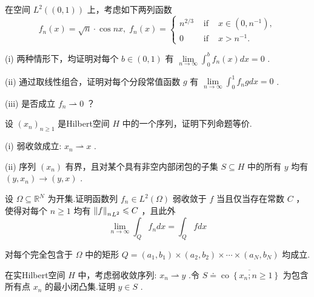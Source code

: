 \begin{rbhw}
在空间 ${L}^{2}\left( \left(  {0,1}\right)  \right)$ 上，考虑如下两列函数
\[
{f}_{n}\left( x\right)  = \sqrt{n} \cdot  \cos {nx},\;{f}_{n}\left( x\right)  = \left\{  \begin{matrix} {n}^{2/3} & \text{ if } & x \in  \left(  {0,{n}^{-1}}\right)  , \\  0 & \text{ if } & x > {n}^{-1}. \end{matrix}\right.
\]

(i) 两种情形下，均证明对每个 $b \in  \left(  {0,1}\right)$ 有 $\mathop{\lim }\limits_{{n \rightarrow  \infty }}{\int }_{0}^{b}{f}_{n}\left( x\right) {dx} = 0$ .

(ii) 通过取线性组合，证明对每个分段常值函数 $g$ 有 $\mathop{\lim }\limits_{{n \rightarrow  \infty }}{\int }_{0}^{1}{f}_{n}{gdx} = 0$ .

(iii) 是否成立 ${f}_{n} \rightharpoonup  0$ ？
\end{rbhw}

\begin{rbhw}
设 ${\left( {x}_{n}\right) }_{n \geq  1}$ 是Hilbert空间 $H$ 中的一个序列，证明下列命题等价.

(i) 弱收敛成立: ${x}_{n} \rightharpoonup  x$ .

(ii) 序列 $\left( {x}_{n}\right)$ 有界，且对某个具有非空内部闭包的子集 $S \subseteq  H$ 中的所有 $y$ 均有 $\left( {y,{x}_{n}}\right)  \rightarrow  \left( {y,x}\right)$ .
\end{rbhw}

\begin{rbhw}
设 $\Omega  \subseteq  {\mathbb{R}}^{N}$ 为开集.证明函数列 ${f}_{n} \in  {L}^{2}\left( \Omega \right)$ 弱收敛于 $f$ 当且仅当存在常数 $C$ ，使得对每个 $n \geq  1$ 均有 ${\norm{f}_{n}}_{{L}^{2}} \leqslant  C$ ，且此外
\[
\mathop{\lim }\limits_{{n \rightarrow  \infty }}{\int }_{Q}{f}_{n}{dx} = {\int }_{Q}{fdx}
\]

对每个完全包含于 $\Omega$ 中的矩形 $Q = \left(  {{a}_{1},{b}_{1}}\right)   \times  \left(  {{a}_{2},{b}_{2}}\right)   \times  \cdots  \times  \left(  {{a}_{N},{b}_{N}}\right)$ 均成立.
\end{rbhw}

\begin{rbhw}
在实Hilbert空间 $H$ 中，考虑弱收敛序列: ${x}_{n} \rightharpoonup  y$ .令 $S \doteq  \overline{\operatorname{co}\left\{  {{x}_{n};n \geq  1}\right\}  }$ 为包含所有点 ${x}_{n}$ 的最小闭凸集.证明 $y \in  S$ .
\end{rbhw}